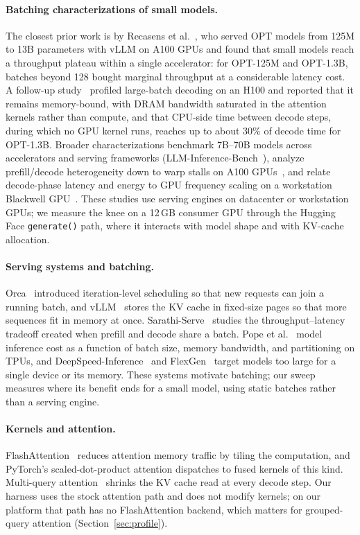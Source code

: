 \documentclass[11pt]{article}
\begin{document}
\paragraph{Batching characterizations of small models.}
The closest prior work is by Recasens et al.~\cite{recasens2024pareto}, who served OPT models from 125M to 13B parameters with vLLM on A100 GPUs and found that small models reach a throughput plateau within a single accelerator: for OPT-125M and OPT-1.3B, batches beyond 128 bought marginal throughput at a considerable latency cost.
A follow-up study~\cite{recasens2025memorygap} profiled large-batch decoding on an H100 and reported that it remains memory-bound, with DRAM bandwidth saturated in the attention kernels rather than compute, and that CPU-side time between decode steps, during which no GPU kernel runs, reaches up to about 30\% of decode time for OPT-1.3B.
Broader characterizations benchmark 7B--70B models across accelerators and serving frameworks (LLM-Inference-Bench~\cite{chittyvenkata2024llminferencebench}), analyze prefill/decode heterogeneity down to warp stalls on A100 GPUs~\cite{wang2025systematic}, and relate decode-phase latency and energy to GPU frequency scaling on a workstation Blackwell GPU~\cite{maliakel2026characterizing}.
These studies use serving engines on datacenter or workstation GPUs; we measure the knee on a 12\,GB consumer GPU through the Hugging Face \texttt{generate()} path, where it interacts with model shape and with KV-cache allocation.

\paragraph{Serving systems and batching.}
Orca~\cite{yu2022orca} introduced iteration-level scheduling so that new requests can join a running batch, and vLLM~\cite{kwon2023vllm} stores the KV cache in fixed-size pages so that more sequences fit in memory at once.
Sarathi-Serve~\cite{agrawal2024sarathi} studies the throughput--latency tradeoff created when prefill and decode share a batch.
Pope et al.~\cite{pope2023scaling} model inference cost as a function of batch size, memory bandwidth, and partitioning on TPUs, and DeepSpeed-Inference~\cite{aminabadi2022deepspeed} and FlexGen~\cite{sheng2023flexgen} target models too large for a single device or its memory.
These systems motivate batching; our sweep measures where its benefit ends for a small model, using static batches rather than a serving engine.

\paragraph{Kernels and attention.}
FlashAttention~\cite{dao2022flashattention,dao2023flashattention2} reduces attention memory traffic by tiling the computation, and PyTorch's scaled-dot-product attention dispatches to fused kernels of this kind.
Multi-query attention~\cite{shazeer2019fast} shrinks the KV cache read at every decode step.
Our harness uses the stock attention path and does not modify kernels; on our platform that path has no FlashAttention backend, which matters for grouped-query attention (Section~\ref{sec:profile}).
\end{document}

